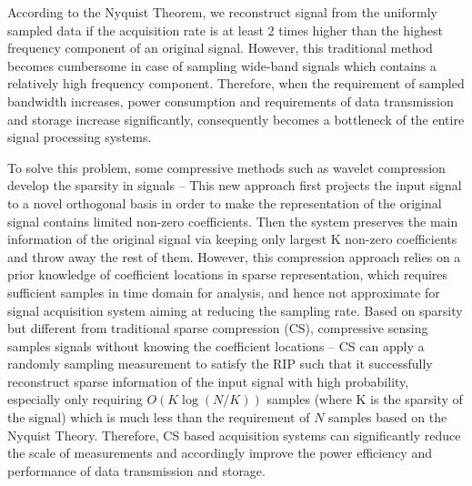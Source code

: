 
According to the Nyquist Theorem, we reconstruct signal from the uniformly sampled data if the acquisition rate is at least 2 times higher than the highest frequency component of an original signal\cite{baraniuk2007compressive,candes2008introduction,davenport2011introduction}. However, this traditional method becomes cumbersome in case of sampling wide-band signals which contains a relatively high frequency component. Therefore, when the requirement of sampled bandwidth increases, power consumption and requirements of data transmission and storage increase significantly, consequently becomes a bottleneck of the entire signal processing systems.

To solve this problem, some compressive methods such as wavelet compression develop the sparsity\cite{starck2010sparse} in signals – This new approach first projects the input signal to a novel orthogonal basis in order to make the representation of the original signal contains limited non-zero coefficients. Then the system preserves the main information of the original signal via keeping only largest K non-zero coefficients and throw away the rest of them. However, this compression approach relies on a prior knowledge of coefficient locations in sparse representation, which requires sufficient samples in time domain for analysis, and hence not approximate for signal acquisition system aiming at reducing the sampling rate\cite{han2013compressive}. Based on sparsity but different from traditional sparse compression (CS), compressive sensing samples signals without knowing the coefficient locations -- CS can apply a randomly sampling measurement to satisfy the RIP\cite{baraniuk2007compressive} such that it successfully reconstruct sparse information of the input signal with high probability, especially only requiring $O(K\log(N/K))$ samples (where K is the sparsity of the signal) which is much less than the requirement of $N$ samples based on the Nyquist Theory\cite{foucart2013mathematical}.    Therefore, CS based acquisition systems can significantly reduce the scale of measurements and accordingly improve the power efficiency and performance of data transmission and storage.   

